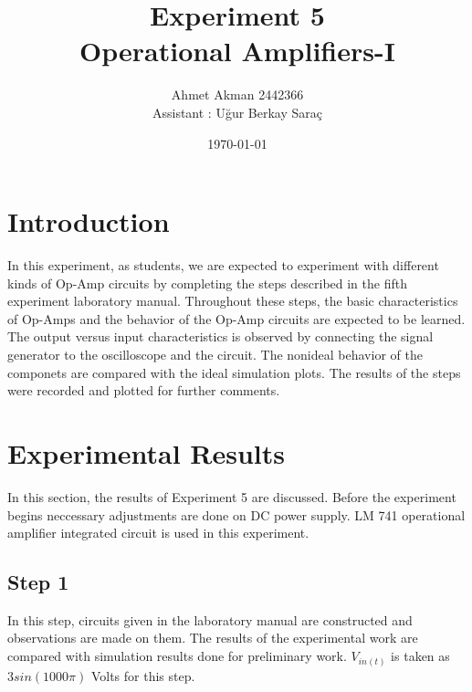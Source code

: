 \documentclass[letterpaper,12pt]{article}
\begin{document}
\title{Experiment 5 \protect\\Operational Amplifiers-I}
\author{Ahmet Akman 2442366 \protect\\ Assistant : Uğur Berkay Saraç}
\date{\today}
\maketitle
\newpage
\tableofcontents
\newpage

\section{Introduction} 
In this experiment, as students, we are expected to experiment with different kinds of Op-Amp circuits by completing the steps described in the fifth experiment laboratory manual. Throughout these steps, the basic characteristics of Op-Amps and the behavior of the Op-Amp circuits are expected to be learned. The output versus input characteristics is observed by connecting the signal generator to the oscilloscope and the circuit. The nonideal behavior of the componets are compared with the ideal simulation plots. The results of the steps were recorded and plotted for further comments.
\section{Experimental Results}
In this section, the results of Experiment 5 are discussed. Before the experiment begins neccessary adjustments are done on DC power supply. LM 741 operational amplifier integrated circuit is used in this experiment.
\subsection{Step 1}
In this step, circuits given in the laboratory manual are constructed and observations are made on them. The results of the experimental work are compared with simulation results done for preliminary work.  \(V_{in (t)}\) is taken as \(3sin(1000\pi)\) Volts for this step.
\end{document}
